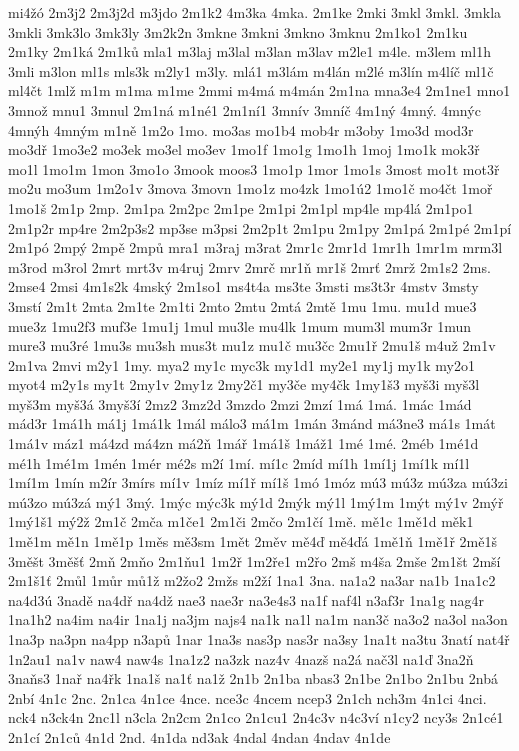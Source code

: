 {mi4žó
2m3j2
2m3j2d
m3jdo
2m1k2
4m3ka
4mka.
2m1ke
2mki
3mkl
3mkl.
3mkla
3mkli
3mk3lo
3mk3ly
3m2k2n
3mkne
3mkni
3mkno
3mknu
2m1ko1
2m1ku
2m1ky
2m1ká
2m1ků
mla1
m3laj
m3lal
m3lan
m3lav
m2le1
m4le.
m3lem
ml1h
3mli
m3lon
ml1s
mls3k
m2ly1
m3ly.
mlá1
m3lám
m4lán
m2lé
m3lín
m4líč
ml1č
ml4čt
1mlž
m1m
m1ma
m1me
2mmi
m4má
m4mán
2m1na
mna3e4
2m1ne1
mno1
3množ
mnu1
3mnul
2m1ná
m1né1
2m1ní1
3mnív
3mníč
4m1ný
4mný.
4mnýc
4mnýh
4mným
m1ně
1m2o
1mo.
mo3as
mo1b4
mob4r
m3oby
1mo3d
mod3r
mo3dř
1mo3e2
mo3ek
mo3el
mo3ev
1mo1f
1mo1g
1mo1h
1moj
1mo1k
mok3ř
mo1l
1mo1m
1mon
3mo1o
3mook
moos3
1mo1p
1mor
1mo1s
3most
mo1t
mot3ř
mo2u
mo3um
1m2o1v
3mova
3movn
1mo1z
mo4zk
1mo1ú2
1mo1č
mo4čt
1moř
1mo1š
2m1p
2mp.
2m1pa
2m2pc
2m1pe
2m1pi
2m1pl
mp4le
mp4lá
2m1po1
2m1p2r
mp4re
2m2p3s2
mp3se
m3psi
2m2p1t
2m1pu
2m1py
2m1pá
2m1pé
2m1pí
2m1pó
2mpý
2mpě
2mpů
mra1
m3raj
m3rat
2mr1c
2mr1d
1mr1h
1mr1m
mrm3l
m3rod
m3rol
2mrt
mrt3v
m4ruj
2mrv
2mrč
mr1ň
mr1š
2mrť
2mrž
2m1s2
2ms.
2mse4
2msi
4m1s2k
4mský
2m1so1
ms4t4a
ms3te
3msti
ms3t3r
4mstv
3msty
3mstí
2m1t
2mta
2m1te
2m1ti
2mto
2mtu
2mtá
2mtě
1mu
1mu.
mu1d
mue3
mue3z
1mu2f3
muf3e
1mu1j
1mul
mu3le
mu4lk
1mum
mum3l
mum3r
1mun
mure3
mu3ré
1mu3s
mu3sh
mus3t
mu1z
mu1č
mu3čc
2mu1ř
2mu1š
m4už
2m1v
2m1va
2mvi
m2y1
1my.
mya2
my1c
myc3k
my1d1
my2e1
my1j
my1k
my2o1
myot4
m2y1s
my1t
2my1v
2my1z
2my2č1
my3če
my4čk
1my1š3
myš3i
myš3l
myš3m
myš3á
3myš3í
2mz2
3mz2d
3mzdo
2mzi
2mzí
1má
1má.
1mác
1mád
mád3r
1má1h
má1j
1má1k
1mál
málo3
má1m
1mán
3mánd
má3ne3
má1s
1mát
1má1v
máz1
má4zd
má4zn
má2ň
1mář
1má1š
1máž1
1mé
1mé.
2méb
1mé1d
mé1h
1mé1m
1mén
1mér
mé2s
m2í
1mí.
mí1c
2míd
mí1h
1mí1j
1mí1k
mí1l
1mí1m
1mín
m2ír
3mírs
mí1v
1míz
mí1ř
mí1š
1mó
1móz
mú3
mú3z
mú3za
mú3zi
mú3zo
mú3zá
mý1
3mý.
1mýc
mýc3k
mý1d
2mýk
mý1l
1mý1m
1mýt
mý1v
2mýř
1mý1š1
mý2ž
2m1č
2mča
m1če1
2m1či
2mčo
2m1čí
1mě.
mě1c
1mě1d
měk1
1mě1m
mě1n
1mě1p
1měs
mě3sm
1mět
2měv
mě4ď
mě4ďá
1mě1ň
1mě1ř
2mě1š
3měšt
3měšť
2mň
2mňo
2m1ňu1
1m2ř
1m2ře1
m2řo
2mš
m4ša
2mše
2m1št
2mší
2m1š1ť
2můl
1můr
mů1ž
m2žo2
2mžs
m2ží
1na1
3na.
na1a2
na3ar
na1b
1na1c2
na4d3ú
3nadě
na4dř
na4dž
nae3
nae3r
na3e4s3
na1f
naf4l
n3af3r
1na1g
nag4r
1na1h2
na4im
na4ir
1na1j
na3jm
najs4
na1k
na1l
na1m
nan3č
na3o2
na3ol
na3on
1na3p
na3pn
na4pp
n3apů
1nar
1na3s
nas3p
nas3r
na3sy
1na1t
na3tu
3natí
nat4ř
1n2au1
na1v
naw4
naw4s
1na1z2
na3zk
naz4v
4nazš
na2á
nač3l
na1ď
3na2ň
3naňs3
1nař
na4řk
1na1š
na1ť
na1ž
2n1b
2n1ba
nbas3
2n1be
2n1bo
2n1bu
2nbá
2nbí
4n1c
2nc.
2n1ca
4n1ce
4nce.
nce3c
4ncem
ncep3
2n1ch
nch3m
4n1ci
4nci.
nck4
n3ck4n
2nc1l
n3cla
2n2cm
2n1co
2n1cu1
2n4c3v
n4c3ví
n1cy2
ncy3s
2n1cé1
2n1cí
2n1ců
4n1d
2nd.
4n1da
nd3ak
4ndal
4ndan
4ndav
4n1de
}
